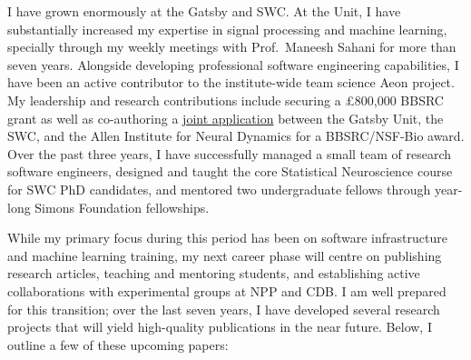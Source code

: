\documentclass{article}
\begin{document}
I have grown enormously at the Gatsby and SWC.
%
At the Unit, I have substantially increased my expertise in signal processing
and machine learning, specially through my weekly meetings with Prof.~Maneesh
Sahani for more than seven years.
%
Alongside developing professional software engineering capabilities, I have
been an active contributor to the institute-wide team science Aeon project.
%
My leadership and research contributions include securing a £800,000 BBSRC
grant as well as co-authoring a \href{}{joint application} between the
Gatsby Unit, the SWC, and the Allen Institute for Neural Dynamics for a
BBSRC/NSF-Bio award.
%
Over the past three years, I have successfully managed a small team of research
software engineers, designed and taught the core Statistical Neuroscience
course for SWC PhD candidates, and mentored two undergraduate fellows through
year-long Simons Foundation fellowships.

While my primary focus during this period has been on software infrastructure
and machine learning training, my next career phase will centre on publishing
research articles, teaching and mentoring students, and establishing active
collaborations with experimental groups at NPP and CDB.
%
I am well prepared for this transition; over the last seven years, I have
developed several research projects that will yield high-quality publications
in the near future. Below, I outline a few of these upcoming papers:
\end{document}
